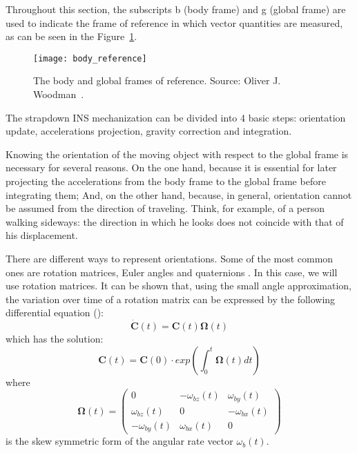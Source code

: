 Throughout this section, the subscripts b (body frame) and g (global frame) are used to indicate the frame of reference in which vector quantities are measured, as can be seen in the Figure~\ref{fig:body_reference}.
\begin{figure}[!t]
    \centering
	\texttt{[image: body\_reference]}    	
	\caption[The body and global frames of reference]{The body and global frames of reference. Source: Oliver J. Woodman~\cite{woodman_introduction_2007}.}
	\label{fig:body_reference}
\end{figure}

The strapdown INS mechanization can be divided into 4 basic steps: orientation update, accelerations projection, gravity correction and integration.

Knowing the orientation of the moving object with respect to the global frame is necessary for several reasons.
On the one hand, because it is essential for later projecting the accelerations from the body frame to the global frame before integrating them;
And, on the other hand, because, in general, orientation cannot be assumed from the direction of traveling. 
Think, for example, of a person walking sideways: the direction in which he looks does not coincide with that of his displacement.

There are different ways to represent orientations.
Some of the most common ones are rotation matrices, Euler angles and quaternions \cite{shuster_survey_1993}. 
In this case, we will use rotation matrices.	
It can be shown that, using the small angle approximation, the variation over time of a rotation matrix can be expressed by the following differential equation (\cite{titterton_strapdown_2004, woodman_introduction_2007}):
\begin{equation}
\label{eqn_dcm_ed}
	\boldsymbol{\dot{C}}(t)=\boldsymbol{C}(t)\boldsymbol{\Omega}(t)
\end{equation}	
which has the solution:
\begin{equation}
\label{eqn_dcm_ed_sol}
	\boldsymbol{C}(t)=\boldsymbol{C}(0)\cdot exp \left( \int_{0}^{t}\boldsymbol{\Omega}(t) dt \right)
\end{equation}		
where
\begin{equation}
\label{eqn_skew_matrix}
	\boldsymbol{\Omega}(t)=
	\begin{pmatrix}
		0&-\omega_{bz}(t)&\omega_{by}(t)\\
		\omega_{bz}(t)&0&-\omega_{bx}(t)\\
		-\omega_{by}(t)&\omega_{bx}(t)&0
	\end{pmatrix}		
\end{equation}	
is the skew symmetric form of the angular rate vector $\omega_b(t)$.

